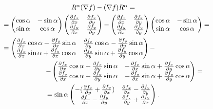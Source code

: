 \begin{multline}
\label{formula:ugly_commutant}
  \textstyle R^\alpha (\nabla f) - (\nabla f) R^\alpha = \\
  \shoveleft \textstyle = \begin{pmatrix} 
    \cos \alpha & -\sin \alpha \\ 
    \sin \alpha & \cos \alpha 
  \end{pmatrix} 
  \begin{pmatrix} 
    \frac{\partial f_x}{\partial x} & \frac{\partial f_x}{\partial y} \\
    \frac{\partial f_y}{\partial x} & \frac{\partial f_y}{\partial y} 
  \end{pmatrix} - 
  \begin{pmatrix} 
    \frac{\partial f_x}{\partial x} & \frac{\partial f_x}{\partial y} \\
    \frac{\partial f_y}{\partial x} & \frac{\partial f_y}{\partial y} 
  \end{pmatrix}
  \begin{pmatrix} 
    \cos \alpha & -\sin \alpha \\
    \sin \alpha & \cos \alpha 
  \end{pmatrix} = \\
  \shoveleft \textstyle = \begin{pmatrix}
    \frac{\partial f_x}{\partial x} \cos \alpha - \frac{\partial f_y}{\partial x} \sin \alpha &
    \frac{\partial f_x}{\partial y} \cos \alpha - \frac{\partial f_y}{\partial y} \sin \alpha \\
    \frac{\partial f_x}{\partial x} \sin \alpha + \frac{\partial f_y}{\partial x} \cos \alpha &
    \frac{\partial f_x}{\partial y} \sin \alpha + \frac{\partial f_y}{\partial y} \cos \alpha 
  \end{pmatrix} - \\
  \shoveright{ \textstyle- \begin{pmatrix} 
    \frac{\partial f_x}{\partial x} \cos \alpha + \frac{\partial f_x}{\partial y} \sin \alpha &
    - \frac{\partial f_x}{\partial x} \sin \alpha + \frac{\partial f_x}{\partial y} \cos \alpha \\
    \frac{\partial f_y}{\partial x} \cos \alpha + \frac{\partial f_y}{\partial y} \sin \alpha &
    - \frac{\partial f_y}{\partial x} \sin \alpha + \frac{\partial f_y}{\partial y} \cos \alpha 
  \end{pmatrix} = } \\
  = \textstyle \sin \alpha \begin{pmatrix}
    -(\frac{\partial f_x}{\partial y} + \frac{\partial f_y}{\partial x}) &
    \frac{\partial f_x}{\partial x} - \frac{\partial f_y}{\partial y} \\
    \frac{\partial f_x}{\partial x} - \frac{\partial f_y}{\partial y} &
    \frac{\partial f_x}{\partial y} + \frac{\partial f_y}{\partial x} 
  \end{pmatrix}.
\end{multline}
